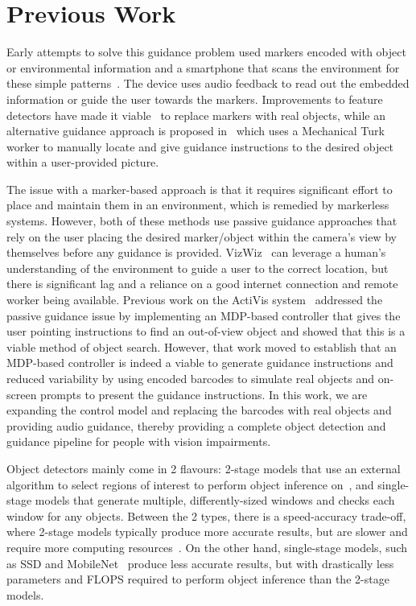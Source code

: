 \documentclass[runningheads]{llncs}
\begin{document}
\section{Previous Work}\label{sec:previous-work}

Early attempts to solve this guidance problem used markers encoded with object or environmental information and a smartphone that scans the environment for these simple patterns~\cite{gude2013blind,manduchi2012mobile}. 
The device uses audio feedback to read out the embedded information or guide the user towards the markers. 
Improvements to feature detectors have made it viable~\cite{redmon2016you} to replace markers with real objects, while an alternative guidance approach is proposed in~\cite{bigham2010vizwiz} which uses a Mechanical Turk worker to manually locate and give guidance instructions to the desired object within a user-provided picture. 

The issue with a marker-based approach is that it requires significant effort to place and maintain them in an environment, which is remedied by markerless systems.
However, both of these methods use passive guidance approaches that rely on the user placing the desired marker/object within the camera's view by themselves before any guidance is provided. 
VizWiz~\cite{bigham2010vizwiz} can leverage a human's understanding of the environment to guide a user to the correct location, but there is significant lag and a reliance on a good internet connection and remote worker being available. 
Previous work on the ActiVis system~\cite{lock2019active} addressed the passive guidance issue by implementing an MDP-based controller that gives the user pointing instructions to find an out-of-view object and showed that this is a viable method of object search. 
However, that work moved to establish that an MDP-based controller is indeed a viable to generate guidance instructions and reduced variability by using encoded barcodes to simulate real objects and on-screen prompts to present the guidance instructions.
In this work, we are expanding the control model and replacing the barcodes with real objects and providing audio guidance, thereby providing a complete object detection and guidance pipeline for people with vision impairments.  

Object detectors mainly come in 2 flavours: 2-stage models that use an external algorithm to select regions of interest to perform object inference on~\cite{ren2015faster}, and single-stage models that generate multiple, differently-sized windows and checks each window for any objects.
Between the 2 types, there is a speed-accuracy trade-off, where 2-stage models typically produce more accurate results, but are slower and require more computing resources~\cite{liu2018deeplf}.
On the other hand, single-stage models, such as SSD and MobileNet~\cite{liu2016ssd,howard2017mobilenet} produce less accurate results, but with drastically less parameters and FLOPS required to perform object inference than the 2-stage models. 
\end{document}
